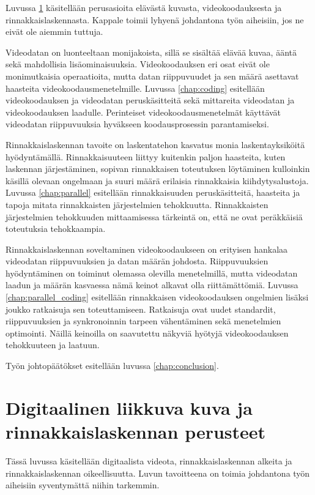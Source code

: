 Luvussa \ref{chap:intro} käsitellään perusasioita elävästä kuvasta,
videokoodauksesta ja rinnakkaislaskennasta. Kappale toimii lyhyenä johdantona
työn aiheisiin, jos ne eivät ole aiemmin tuttuja.

Videodatan on luonteeltaan monijakoista, sillä se sisältää elävää kuvaa, ääntä
sekä mahdollisia lisäominaisuuksia. Videokoodauksen eri osat eivät ole
monimutkaisia operaatioita, mutta datan riippuvuudet ja sen määrä asettavat
haasteita videokoodausmenetelmille. Luvussa \ref{chap:coding} esitellään
videokoodauksen ja videodatan peruskäsitteitä sekä mittareita
videodatan ja videokoodauksen laadulle. Perinteiset videokoodausmenetelmät
käyttävät videodatan riippuvuuksia hyväkseen koodausprosessin parantamiseksi.

Rinnakkaislaskennan tavoite on laskentatehon kasvatus monia laskentayksiköitä
hyödyntämällä. Rinnakkaisuuteen liittyy kuitenkin paljon haasteita, kuten laskennan
järjestäminen, sopivan rinnakkaisen toteutuksen löytäminen kulloinkin käsillä
olevaan ongelmaan ja suuri määrä erilaisia rinnakkaisia kiihdytysalustoja.
Luvussa \ref{chap:parallel} esitellään rinnakkaisuuden peruskäsitteitä,
haasteita ja  tapoja mitata rinnakkaisten järjestelmien tehokkuutta.
Rinnakkaisten järjestelmien tehokkuuden mittaamisessa tärkeintä on, että ne ovat
peräkkäisiä toteutuksia tehokkaampia.

Rinnakkaislaskennan soveltaminen videokoodaukseen on erityisen hankalaa
videodatan riippuvuuksien ja datan määrän johdosta. Riippuvuuksien hyödyntäminen
on toiminut olemassa olevilla menetelmillä,
mutta videodatan laadun ja määrän kasvaessa nämä keinot alkavat olla
riittämättömiä. Luvussa \ref{chap:parallel_coding}
esitellään rinnakkaisen videokoodauksen ongelmien lisäksi
joukko ratkaisuja sen toteuttamiseen. Ratkaisuja ovat uudet standardit, riippuvuuksien ja
synkronoinnin tarpeen vähentäminen sekä menetelmien optimointi. Näillä keinoilla
on saavutettu näkyviä hyötyjä videokoodauksen tehokkuuteen ja laatuun.

Työn johtopäätökset esitellään luvussa \ref{chap:conclusion}.

\section{Digitaalinen liikkuva kuva ja rinnakkaislaskennan perusteet}
\label{chap:intro}

Tässä luvussa käsitellään digitaalista videota, rinnakkaislaskennan alkeita
ja rinnakkaislaskennan oikeellisuutta. Luvun tavoitteena on
toimia johdantona työn aiheisiin syventymättä niihin tarkemmin.

